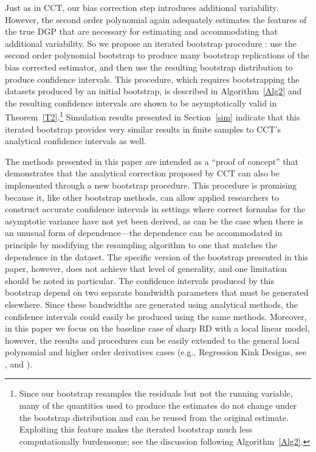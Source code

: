 \documentclass[12pt,fleqn]{article}
\begin{document}
Just as in CCT, our bias correction step introduces additional
variability. However, the second order polynomial again adequately estimates the
features of the true DGP that are necessary for estimating and accommodating that
additional variability. So we propose
an iterated bootstrap procedure \citep{hall1988}: use the second order
polynomial bootstrap to produce many bootstrap replications of the bias
corrected estimator, and then use the resulting bootstrap distribution to
produce confidence intervals. This procedure, which requires bootstrapping the
datasets produced by an initial bootstrap, is described in Algorithm~\ref{Alg2}
and the resulting confidence intervals are shown to be asymptotically valid in
Theorem~\ref{T2}.\footnote{%
  Since our bootstrap resamples the residuals but not the running variable, many
  of the quantities used to produce the estimates do not change under the
  bootstrap distribution and can be reused from the original
  estimate. Exploiting this feature makes the iterated bootstrap much less
  computationally burdensome; see the discussion following
  Algorithm~\ref{Alg2}.} %
Simulation results presented in Section~\ref{sim} indicate that this iterated
bootstrap provides very similar results in finite samples to CCT's analytical
confidence intervals as well.

The methods presented in this paper are intended as a ``proof of concept'' that
demonstrates that the analytical correction proposed by CCT can also be
implemented through a new bootstrap procedure.  This procedure is promising
because it, like other bootstrap methods, can allow applied researchers to
construct accurate confidence intervals in settings where correct formulas for
the asymptotic variance have not yet been derived, as can be the case when there
is an unusual form of dependence---the dependence
can be accommodated in principle by modifying the resampling algorithm to one
that matches the dependence in the dataset. The specific version of the bootstrap
presented in this paper, however, does not achieve that level of generality,
and one limitation should be noted in particular. The confidence
intervals produced by this bootstrap depend on two separate bandwidth parameters
that must be generated elsewhere. Since these bandwidths are generated using
analytical methods, the confidence intervals could easily be produced using the
same methods. Moreover, in this paper we focus on the baseline case of
sharp RD with a local linear model, however, the results and procedures can be
easily extended to the general local polynomial and higher order derivatives
cases (e.g., Regression Kink Designs, see \citealp{card2009b}, and
\citealp{CardEtAl1,CardEtAl2}).
\end{document}
